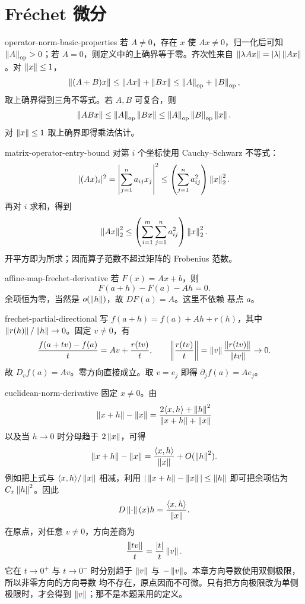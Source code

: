\chapter{Fréchet 微分}
\label{chap:frechet-differential-solutions}

\begin{solution}{operator-norm-basic-properties}
若 \(A\ne0\)，存在 \(x\) 使 \(Ax\ne0\)，归一化后可知
\(\left\lVert A\right\rVert_{\mathrm{op}}>0\)；若 \(A=0\)，则定义中的上确界等于零。齐次性来自
\(\left\lVert\lambda Ax\right\rVert=|\lambda|\left\lVert Ax\right\rVert\)。对 \(\left\lVert x\right\rVert\le1\)，
\[
 \left\lVert(A+B)x\right\rVert\le\left\lVert Ax\right\rVert+\left\lVert Bx\right\rVert
 \le\left\lVert A\right\rVert_{\mathrm{op}}+\left\lVert B\right\rVert_{\mathrm{op}},
\]
取上确界得到三角不等式。若 \(A,B\) 可复合，则
\[
 \left\lVert ABx\right\rVert\le\left\lVert A\right\rVert_{\mathrm{op}}\left\lVert Bx\right\rVert
 \le\left\lVert A\right\rVert_{\mathrm{op}}\left\lVert B\right\rVert_{\mathrm{op}}\left\lVert x\right\rVert.
\]
对 \(\left\lVert x\right\rVert\le1\) 取上确界即得乘法估计。
\end{solution}

\begin{solution}{matrix-operator-entry-bound}
对第 \(i\) 个坐标使用 Cauchy--Schwarz 不等式：
\[
 |(Ax)_i|^2
 =\left|\sum_{j=1}^na_{ij}x_j\right|^2
 \le\left(\sum_{j=1}^na_{ij}^2\right)\left\lVert x\right\rVert_2^2.
\]
再对 \(i\) 求和，得到
\[
 \left\lVert Ax\right\rVert_2^2\le
 \left(\sum_{i=1}^m\sum_{j=1}^na_{ij}^2\right)\left\lVert x\right\rVert_2^2.
\]
开平方即为所求；因而算子范数不超过矩阵的 Frobenius 范数。
\end{solution}

\begin{solution}{affine-map-frechet-derivative}
若 \(F(x)=Ax+b\)，则
\[
 F(a+h)-F(a)-Ah=0.
\]
余项恒为零，当然是 \(o(\left\lVert h\right\rVert)\)，故 \(DF(a)=A\)。这里不依赖
基点 \(a\)。
\end{solution}

\begin{solution}{frechet-partial-directional}
写 \(f(a+h)=f(a)+Ah+r(h)\)，其中
\(\left\lVert r(h)\right\rVert/\left\lVert h\right\rVert\to0\)。固定 \(v\ne0\)，有
\[
 \frac{f(a+tv)-f(a)}t
 =Av+\frac{r(tv)}t,
 \qquad
 \left\|\frac{r(tv)}t\right\|
 =\left\lVert v\right\rVert\frac{\left\lVert r(tv)\right\rVert}{\left\lVert tv\right\rVert}\to0.
\]
故 \(D_vf(a)=Av\)。零方向直接成立。取 \(v=e_j\) 即得
\(\partial_jf(a)=Ae_j\)。
\end{solution}

\begin{solution}{euclidean-norm-derivative}
固定 \(x\ne0\)。由
\[
 \left\lVert x+h\right\rVert-\left\lVert x\right\rVert
 =\frac{2\langle x,h\rangle+\left\lVert h\right\rVert^2}{\left\lVert x+h\right\rVert+\left\lVert x\right\rVert}
\]
以及当 \(h\to0\) 时分母趋于 \(2\left\lVert x\right\rVert\)，可得
\[
 \left\lVert x+h\right\rVert-\left\lVert x\right\rVert
 =\frac{\langle x,h\rangle}{\left\lVert x\right\rVert}+O(\left\lVert h\right\rVert^2).
\]
例如把上式与 \(\langle x,h\rangle/\left\lVert x\right\rVert\) 相减，利用
\(|\left\lVert x+h\right\rVert-\left\lVert x\right\rVert|\le\left\lVert h\right\rVert\) 即可把余项估为
\(C_x\left\lVert h\right\rVert^2\)。因此
\[
 D\left\lVert\cdot\right\rVert(x)h=\frac{\langle x,h\rangle}{\left\lVert x\right\rVert}.
\]
在原点，对任意 \(v\ne0\)，方向差商为
\[
 \frac{\left\lVert tv\right\rVert}t=\frac{|t|}{t}\left\lVert v\right\rVert.
\]
它在 \(t\to0^+\) 与 \(t\to0^-\) 时分别趋于 \(\left\lVert v\right\rVert\) 与
\(-\left\lVert v\right\rVert\)。本章方向导数使用双侧极限，所以非零方向的方向导数
均不存在，原点因而不可微。只有把方向极限改为单侧极限时，才会得到
\(\left\lVert v\right\rVert\)；那不是本题采用的定义。
\end{solution}


